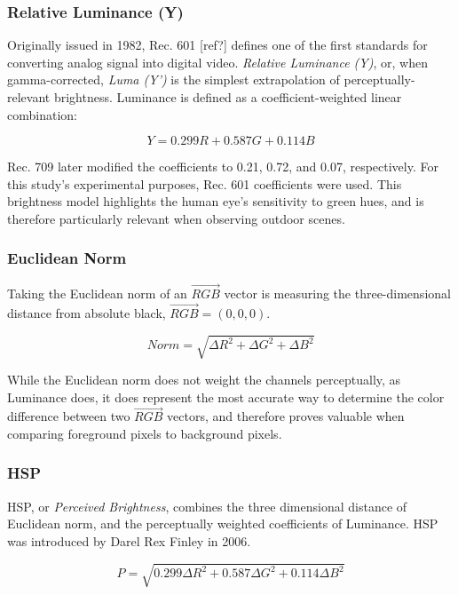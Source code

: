 \documentclass[12pt]{report}
\begin{document}
\subsubsection{Relative Luminance (Y)}

Originally issued in 1982, Rec. 601 [ref?] defines 	one of the first standards for converting analog signal into digital video. \textit{Relative Luminance (Y)}, or, when gamma-corrected, \textit{Luma (Y')} is the simplest extrapolation of perceptually-relevant brightness. Luminance is defined as a coefficient-weighted linear combination:

\begin{equation}
Y = 0.299R + 0.587G + 0.114B
\end{equation}

Rec. 709 later modified the coefficients to 0.21, 0.72, and 0.07, respectively. For this study's experimental purposes, Rec. 601 coefficients were used. This brightness model highlights the human eye's sensitivity to green hues, and is therefore particularly relevant when observing outdoor scenes. 

\subsubsection{Euclidean Norm}

Taking the Euclidean norm of an $\vec{RGB}$ vector is measuring the three-dimensional distance from absolute black, $\vec{RGB} = (0,0,0)$. 

\begin{equation}
Norm = \sqrt{\Delta R^2 + \Delta G^2 + \Delta B^2}
\end{equation}

While the Euclidean norm does not weight the channels perceptually, as Luminance does, it does represent the most accurate way to determine the color difference between two $\vec{RGB}$ vectors, and therefore proves valuable when comparing foreground pixels to background pixels. 

\subsubsection{HSP}

HSP, or \textit{Perceived Brightness}, combines the three dimensional distance of Euclidean norm, and the perceptually weighted coefficients of Luminance. HSP was introduced by Darel Rex Finley in 2006.

\begin{equation}
P = \sqrt{0.299\Delta R^2 + 0.587\Delta G^2 + 0.114\Delta B^2}
\end{equation}
\end{document}
